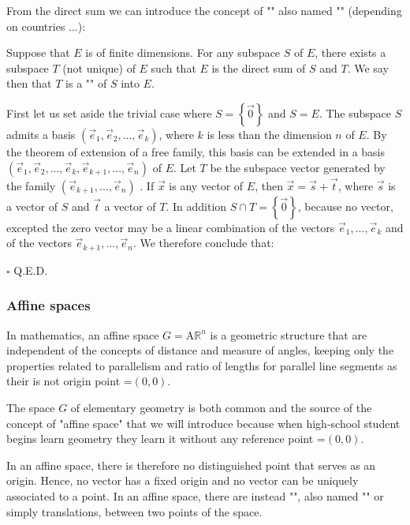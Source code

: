 	From the direct sum we can introduce the concept of "" also named "" (depending on countries ...):
	\begin{theorem}
	Suppose that $E$ is of finite dimensions. For any subspace $S$ of $E$, there exists a subspace $T$ (not unique) of $E$ such that $E$ is the direct sum of $S$ and $T$. We say then that $T$ is a "" of $S$ into $E$.
	\end{theorem}
	\begin{dem}
	First let us set aside the trivial case where $S=\left\lbrace \vec{0} \right\rbrace$  and $S = E$. The subspace $S$ admits a basis $(\vec{e}_1,\vec{e}_2,...,\vec{e}_k)$, where $k$ is less than the dimension $n$ of $E$. By the theorem of extension of a free family, this basis can be extended in a basis $(\vec{e}_1,\vec{e}_2,...,\vec{e}_k,\vec{e}_{k+1},...,\vec{e}_n)$ of $E$. Let $T$ be the subspace vector generated by the family $(\vec{e}_{k+1},...,\vec{e}_n)$ . If $\vec{x}$ is any vector of $E$, then $\vec{x}=\vec{s}+\vec{t}$, where $\vec{s}$ is a vector of $S$ and $\vec{t}$ a vector of $T$. In addition $S\cap T=\left\lbrace \vec{0} \right\rbrace$, because no vector, excepted the zero vector may be a linear combination of the vectors $\vec{e}_1,...,\vec{e}_k$ and of the vectors $\vec{e}_{k+1},...,\vec{e}_n$. We therefore conclude that:
	\begin{flushright}
		$\square$  Q.E.D.
	\end{flushright}
	\end{dem}
	
	\subsubsection{Affine spaces}\label{affine space}
	In mathematics, an affine space $G=\text{A}\mathbb{R}^n$ is a geometric structure that are independent of the concepts of distance and measure of angles, keeping only the properties related to parallelism and ratio of lengths for parallel line segments as their is not origin point $\text{=}(0,0)$.
	
	The space $G$ of elementary geometry is both common and the source of the concept of "affine space" that we will introduce because when high-school student begins learn geometry they learn it without any reference point $\text{=}(0,0)$.

	In an affine space, there is therefore no distinguished point that serves as an origin. Hence, no vector has a fixed origin and no vector can be uniquely associated to a point. In an affine space, there are instead "", also named "\label{translation vector}" or simply translations, between two points of the space.
	
